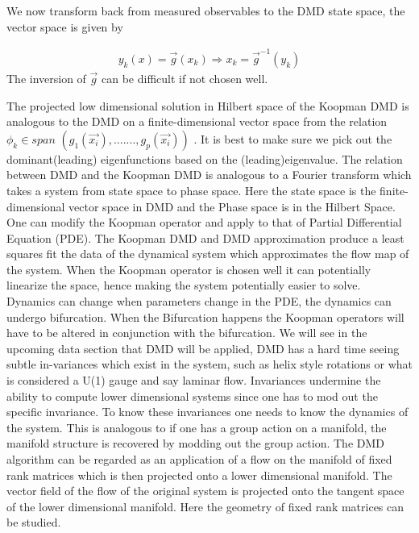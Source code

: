 \documentclass[12pt]{report}
\begin{document}
We now transform back from measured observables to the DMD state space, the
vector space is given by

\begin{equation}
    \begin{aligned}
    y_{k}(x)=\vec{g}(x_{k})\Longrightarrow x_{k}=\vec{g}%
    ^{-1}(y_{k})
    \end{aligned}
\end{equation}
The inversion of $\vec{g}$ can be difficult if not chosen well.

The projected low dimensional solution in Hilbert space of the
Koopman DMD is analogous to the DMD on a finite-dimensional vector space from the relation $\phi _{k}\in span$ $(g_{1}(\vec{x_{i}}%
),.......,g_{p}(\vec{x_{i}}))$ . It is best to make sure we
pick out the dominant(leading) eigenfunctions based on the
(leading)eigenvalue. The relation between DMD and the Koopman DMD is
analogous to a Fourier transform which takes a system from state space to
phase space. Here the state space is the finite-dimensional vector space
in DMD and the Phase space is in the Hilbert Space. One can modify the
Koopman operator and apply to that of Partial Differential Equation (PDE). The Koopman DMD and DMD approximation produce a least squares fit the data of the dynamical
system which approximates the flow map of the system. When the Koopman
operator is chosen well it can potentially linearize the space, hence making the system potentially easier to solve. Dynamics can change when parameters change in the PDE, the dynamics can undergo bifurcation. When the Bifurcation happens the Koopman operators will have to be altered in
conjunction with the bifurcation. We will see in the upcoming data section
that DMD will be applied, DMD has a hard time seeing subtle in-variances
which exist in the system, such as helix style rotations or what is
considered a U(1) gauge and say laminar flow. Invariances undermine the
ability to compute lower dimensional systems since one has to mod out
the specific invariance. To know these invariances one needs to know the
dynamics of the system. This is analogous to if one has a group action on
a manifold, the manifold structure is recovered by modding out the group
action. The DMD algorithm can be regarded as an application of a flow on the
manifold of fixed rank matrices which is then projected onto a lower
dimensional manifold. The vector field of the flow of the original
system is projected onto the tangent space of the lower dimensional
manifold. Here the geometry of fixed rank matrices can be studied. 
\end{document}
